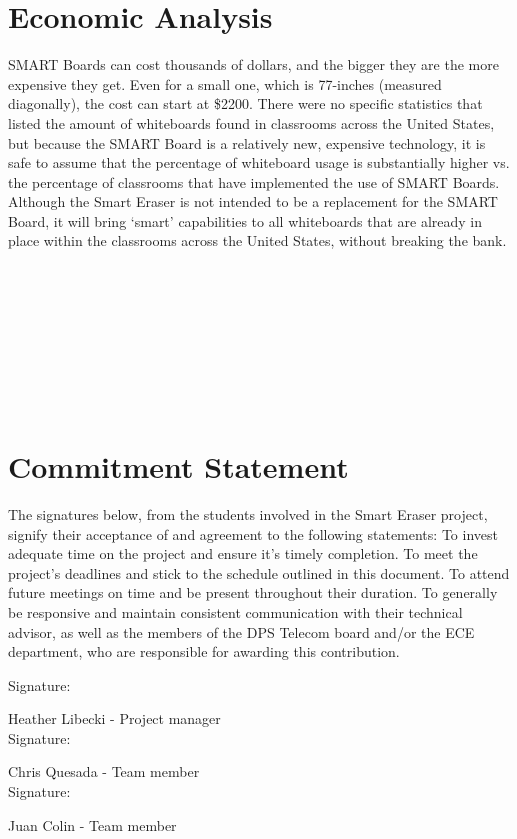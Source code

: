 \documentclass[10pt,onecolumn,draftcls]{IEEEtran} 					%
\begin{document}
	\section{Economic Analysis}
	\setlength{\parindent}{5ex}
	SMART Boards can cost thousands of dollars, and the bigger they are the more expensive they get. Even for a small one, which is 77-inches (measured diagonally), the cost can start at \$2200. There were no specific statistics that listed the amount of whiteboards found in classrooms across the United States, but because the SMART Board is a relatively new, expensive technology, it is safe to assume that the percentage of whiteboard usage is substantially higher vs. the percentage of classrooms that have implemented the use of SMART Boards. Although the Smart Eraser is not intended to be a replacement for the SMART Board, it will bring {\lq}smart{\rq} capabilities to all whiteboards that are already in place within the classrooms across the United States, without breaking the bank.\\\\\\\\\\\\\\\\\\
	\section{Commitment Statement}
	\setlength{\parindent}{5ex}
	The signatures below, from the students involved in the Smart Eraser project, signify their acceptance of and agreement to the following statements:
	To invest adequate time on the project and ensure it{\rq}s timely completion.
	To meet the project{\rq}s deadlines and stick to the schedule outlined in this document.
	To attend future meetings on time and be present throughout their duration.
	To generally be responsive and maintain consistent communication with their technical advisor, as well as the members of the DPS Telecom board and/or the ECE department, who are responsible for awarding this contribution.\\
	\begin{flushleft}
	Signature: \hrulefill
	
	\hspace*{0mm}\phantom{Approved: }Heather Libecki - Project manager\\
	\vspace{12pt}
	Signature: \hrulefill
	
	\hspace*{0mm}\phantom{Approved: }Chris Quesada - Team member\\
	\vspace{12pt}
	Signature: \hrulefill
	
	\hspace*{0mm}\phantom{Approved: }Juan Colin - Team member\\
	
	\end{flushleft}\par
	\setlength{\parindent}{5ex}
\end{document}
